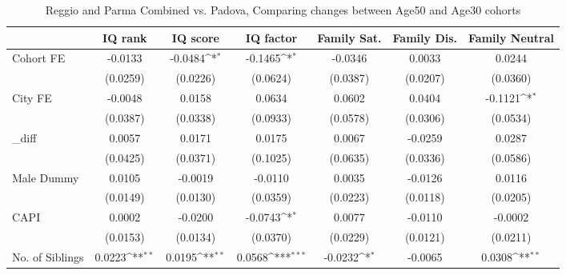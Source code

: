 \begin{table}[htbp]\centering
\def\sym#1{\ifmmode^{#1}\else\(^{#1}\)\fi}
\caption{Reggio and Parma Combined vs. Padova, Comparing changes between Age50 and Age30 cohorts}
\begin{tabular}{l*{6}{c}}
\toprule
            &\multicolumn{1}{c}{IQ rank}&\multicolumn{1}{c}{IQ score}&\multicolumn{1}{c}{IQ factor}&\multicolumn{1}{c}{Family Sat.}&\multicolumn{1}{c}{Family Dis.}&\multicolumn{1}{c}{Family Neutral}\\
\midrule
Cohort FE   &     -0.0133         &     -0.0484\sym{*}  &     -0.1465\sym{*}  &     -0.0346         &      0.0033         &      0.0244         \\
            &    (0.0259)         &    (0.0226)         &    (0.0624)         &    (0.0387)         &    (0.0207)         &    (0.0360)         \\
\addlinespace
City FE     &     -0.0048         &      0.0158         &      0.0634         &      0.0602         &      0.0404         &     -0.1121\sym{*}  \\
            &    (0.0387)         &    (0.0338)         &    (0.0933)         &    (0.0578)         &    (0.0306)         &    (0.0534)         \\
\addlinespace
\_diff       &      0.0057         &      0.0171         &      0.0175         &      0.0067         &     -0.0259         &      0.0287         \\
            &    (0.0425)         &    (0.0371)         &    (0.1025)         &    (0.0635)         &    (0.0336)         &    (0.0586)         \\
\addlinespace
Male Dummy  &      0.0105         &     -0.0019         &     -0.0110         &      0.0035         &     -0.0126         &      0.0116         \\
            &    (0.0149)         &    (0.0130)         &    (0.0359)         &    (0.0223)         &    (0.0118)         &    (0.0205)         \\
\addlinespace
CAPI        &      0.0002         &     -0.0200         &     -0.0743\sym{*}  &      0.0077         &     -0.0110         &     -0.0002         \\
            &    (0.0153)         &    (0.0134)         &    (0.0370)         &    (0.0229)         &    (0.0121)         &    (0.0211)         \\
\addlinespace
No. of Siblings&      0.0223\sym{**} &      0.0195\sym{**} &      0.0568\sym{***}&     -0.0232\sym{*}  &     -0.0065         &      0.0308\sym{**} \\

\end{tabular}
\end{table}
